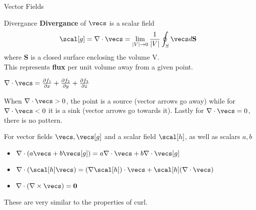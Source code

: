 \documentclass[12pt, letterpaper]{article}
\newcommand{\pder}[2]{\frac{\partial{} #1}{\partial{} #2}}
\begin{document}
\begin{section}{Vector Fields}
\begin{subsection}{Divergance}
    \textbf{Divergance} of \(\vecs\) is a scalar field \[\scal[g] =
      \nabla \cdot \vecs = \lim_{| V | \to 0} \frac{1}{| V |} \oint_{S} \vecs d
      \textbf{S}\] where \textbf{S} is a closed surface enclosing the volume V.
    \\
    This represents \textbf{flux} per unit volume away from a given point.

    \(\nabla \cdot \vecs = \pder{f_{1}}{x} + \pder{f_{2}}{y} + \pder{f_{3}}{z}\)

    When \(\nabla \cdot \vecs > 0\), the point is a source (vector arrows go
    away) while for \(\nabla \cdot \vecs < 0\) it is a sink (vector arrows go
    towards it). Lastly for \(\nabla \cdot \vecs = 0\), there is no pattern.

    For vector fields \(\vecs, \vecs[g]\) and a scalar field \(\scal[h]\), as
    well as scalars \(a, b\)
    \begin{itemize}
      \item \(\nabla \cdot (a \vecs + b \vecs[g]) =
            a \nabla \cdot \vecs + b \nabla \cdot \vecs[g]\)
      \item \(\nabla \cdot (\scal[h] \vecs) =
            (\nabla \scal[h]) \cdot \vecs + \scal[h] (\nabla \cdot \vecs)\)
      \item \(\nabla \cdot (\nabla \times \vecs) = \textbf{0}\)
    \end{itemize}

    These are very similar to the properties of curl.

  \end{subsection}

\end{section}
\end{document}
